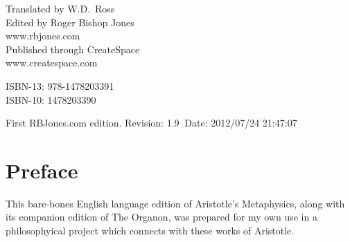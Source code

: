 \begin{titlepage}
\maketitle

\hspace{2in}

\vfill

\begin{centering}

Translated by W.D.~Ross\\
\vspace{0.2in}
Edited by Roger Bishop Jones\\
www.rbjones.com\\
\vspace{0.2in}
Published through CreateSpace\\
www.createspace.com\\
\vspace{0.2in}

ISBN-13: 978-1478203391\\
ISBN-10: 1478203390

\vspace{0.2in}

{\footnotesize

First RBJones.com edition. $ $Revision: 1.9 $~$Date: 2012/07/24 21:47:07 $ $

}%

\end{centering}

\thispagestyle{empty}
\end{titlepage}


{\parskip=0pt\tableofcontents}
\vfill

\pagebreak

\chapter*{Preface}

This bare-bones English language edition of Aristotle's Metaphysics, along with its companion edition of The Organon, was prepared for my own use in a philosophyical project which connects with these works of Aristotle.

